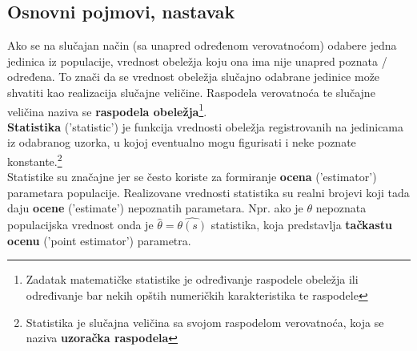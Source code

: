 \documentclass[10pt,a4paper,]{article}
\begin{document}
\subsection{Osnovni pojmovi, nastavak}
Ako se na slučajan način (sa unapred određenom verovatnoćom) odabere 
jedna jedinica iz populacije, vrednost obeležja koju ona ima nije 
unapred poznata / određena. To znači da se vrednost obeležja slučajno 
odabrane jedinice može shvatiti kao realizacija slučajne veličine. 
Raspodela verovatnoća te slučajne veličina naziva se 
\textbf{raspodela 
obeležja}\footnote{Zadatak matematičke statistike je određivanje
raspodele obeležja ili određivanje bar nekih opštih numeričkih 
karakteristika te raspodele}.
\\[0.2cm]
\textbf{Statistika} ('statistic') je funkcija vrednosti obeležja registrovanih 
na jedinicama iz odabranog uzorka, u kojoj eventualno mogu figurisati 
i neke poznate konstante.\footnote{Statistika je slučajna veličina sa svojom raspodelom verovatnoća, koja se naziva \textbf{uzoračka raspodela}}
\\


Statistike su značajne jer se često koriste za formiranje 
\textbf{ocena} ('estimator') parametara populacije. Realizovane vrednosti statistika su realni brojevi koji tada daju \textbf{ocene} 
('estimate') nepoznatih parametara.
Npr. ako je  $\theta$ nepoznata populacijska vrednost onda je 
$\hat{\theta} = \hat{\theta(s)}$ statistika, koja predstavlja \textbf{tačkastu ocenu} ('point 
estimator') parametra. 
\end{document}

